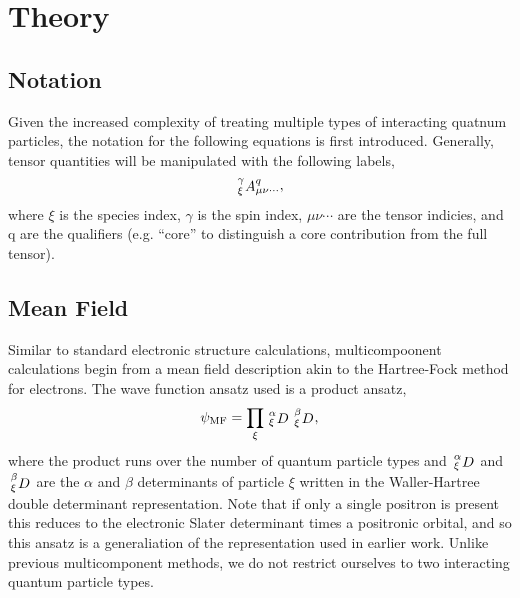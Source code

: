 \section{Theory}
\subsection{Notation}
Given the increased complexity of treating multiple types of interacting quatnum particles, the notation for the following equations is first introduced.
Generally, tensor quantities will be manipulated with the following labels,
\begin{equation}
   \shivten{\gamma}{\xi}{A}{q}{\mu\nu\cdots},
\end{equation}
where $\xi$ is the species index, $\gamma$ is the spin index, $\mu\nu\cdots$ are the tensor indicies, and q are the qualifiers (e.g. ``core'' to distinguish a core contribution from the full tensor).

\subsection{Mean Field}

Similar to standard electronic structure calculations, multicompoonent calculations begin from a mean field description akin to the Hartree-Fock method for electrons.
The wave function ansatz used is a product ansatz, 
\begin{equation}
    \psi_{\textrm{MF}} = \prod_{\xi} \shivten{\alpha}{\xi}{D}{}{} \shivten{\beta}{\xi}{D}{}{},
\end{equation}
where the product runs over the number of quantum particle types and $\shivten{\alpha}{\xi}{D}{}{}$ and $\shivten{\beta}{\xi}{D}{}{}$ are the $\alpha$ and $\beta$ determinants of particle $\xi$ written in the Waller-Hartree double determinant representation.\citehere
Note that if only a single positron is present this reduces to the electronic Slater determinant times a positronic orbital, and so this ansatz is a generaliation of the representation used in earlier work.\cite{10.1088/0022-3700/11/16/001, 10.1088/0022-3700/12/15/007,10.1063/1.438933,10.1063/1.442211,10.1088/0022-3700/14/22/019}
Unlike previous multicomponent methods, we do not restrict ourselves to two interacting quantum particle types.


